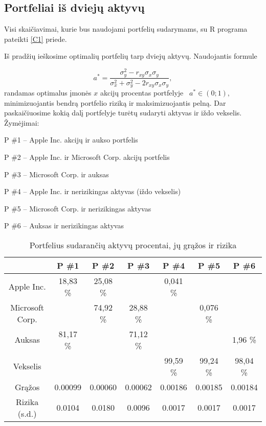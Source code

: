 \documentclass[12pt, a14paper, lithuanian]{article}
\begin{document}
\subsection{Portfeliai iš dviejų aktyvų}

Visi skaičiavimai, kurie bus naudojami portfelių sudarymams, su R programa pateikti \ref{C1} priede.
 
Iš pradžių ieškosime optimalių portfelių tarp dviejų aktyvų. Naudojantis formule

\begin{equation}
a^{\ast}= \frac{\sigma_y^2 - r_{xy}\sigma_x \sigma_y}{\sigma^2_x + \sigma^2_y - 2r_{xy}\sigma_x \sigma_y} , \label{form}
\end{equation} randamas optimalus įmonės $x$ akcijų procentas portfelyje~\cite{cope} $ a^{\ast} \in \left( 0;1 \right), $ minimizuojantis bendrą portfelio riziką ir maksimizuojantis pelną. Dar paskaičiuosime kokią dalį portfelyje turėtų sudaryti aktyvas ir iždo vekselis. \\

Žymėjimai:

P \#1 -- Apple Inc. akcijų ir aukso portfelis

P \#2 -- Apple Inc. ir Microsoft Corp. akcijų portfelis

P \#3 -- Microsoft Corp. ir auksas

P \#4 -- Apple Inc. ir nerizikingas aktyvas (iždo vekselis)

P \#5 -- Microsoft Corp. ir nerizikingas aktyvas

P \#6 -- Auksas ir nerizikingas aktyvas

\begin{table}[ht]
\begin{center}
\begin{tabular}{ccccccc}
  \hline
 & P \#1 & P \#2 & P \#3 & P \#4 & P \#5 & P \#6 \\ 
  \hline
Apple Inc. & 18,83 \% & 25,08 \% &  & 0,041 \%  & & &\\
\hline
 Microsoft Corp. &  & 74,92 \% & 28,88 \% & & 0,076 \% & & \\ 
   \hline
   Auksas & 81,17 \% & & 71,12 \% & & & 1,96 \% & \\
   \hline
   Vekselis & & & & 99,59 \% & 99,24 \% & 98,04 \% & \\
   \hline
   Grąžos & 0.00099 & 0.00060 & 0.00062 & 0.00186 & 0.00185 & 0.00184 &\\
   \hline
   Rizika (s.d.) & 0.0104 & 0.0180 & 0.0096 & 0.0017 & 0.0017 & 0.0017 &\\
   \hline
\end{tabular}
\end{center}
\caption{Portfelius sudarančių aktyvų procentai, jų grąžos ir rizika}
\end{table}
\end{document}
